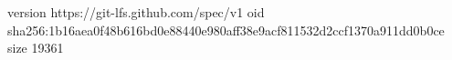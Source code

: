 version https://git-lfs.github.com/spec/v1
oid sha256:1b16aea0f48b616bd0e88440e980aff38e9acf811532d2ccf1370a911dd0b0ce
size 19361
